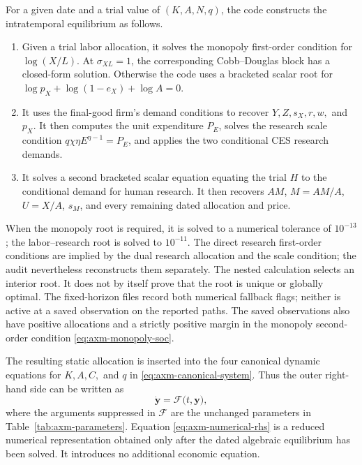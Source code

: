 For a given date and a trial value of \((K,A,N,q)\), the code constructs the
intratemporal equilibrium as follows.
\begin{enumerate}[label=\textbf{\arabic*.},leftmargin=*]
 \item Given a trial labor allocation, it solves the monopoly first-order
 condition for \(\log(X/L)\). At \(\sigma_{XL}=1\), the corresponding
 Cobb--Douglas block has a closed-form solution. Otherwise the code uses a
 bracketed scalar root for
 \(\log p_X+\log(1-e_X)+\log A=0\).
 \item It uses the final-good firm's demand conditions to recover \(Y,Z,s_X,r,w,\)
 and \(p_X\). It then computes the unit expenditure \(P_E\), solves the research
 scale condition \(q\chi\eta E^{\eta-1}=P_E\), and applies the two conditional
 CES research demands.
 \item It solves a second bracketed scalar equation equating the trial \(H\) to
 the conditional demand for human research. It then recovers \(AM\),
 \(M=AM/A\), \(U=X/A\), \(s_M\), and every remaining dated allocation and price.
\end{enumerate}
When the monopoly root is required, it is solved to a numerical tolerance of
\(10^{-13}\); the labor--research root is solved to \(10^{-11}\). The direct research first-order conditions
are implied by the dual research allocation and the scale condition; the audit
nevertheless reconstructs them separately. The nested calculation selects an
interior root. It does not by itself prove that the root is unique or globally
optimal. The fixed-horizon files record both numerical fallback flags; neither is
active at a saved observation on the reported paths. The saved observations also
have positive allocations and a strictly positive margin in the monopoly
second-order condition \eqref{eq:axm-monopoly-soc}.

The resulting static allocation is inserted into the four canonical dynamic equations for
\(K,A,C,\) and \(q\) in \eqref{eq:axm-canonical-system}. Thus the outer right-hand
side can be written as
\begin{equation}
 \dot{\mathbf y}=\mathcal F\bigl(t,\mathbf y\bigr),
 \label{eq:axm-numerical-rhs}
\end{equation}
where the arguments suppressed in \(\mathcal F\) are the unchanged parameters in
Table~\ref{tab:axm-parameters}. Equation \eqref{eq:axm-numerical-rhs} is a
reduced numerical representation obtained only after the dated algebraic
equilibrium has been solved. It introduces no additional economic equation.

